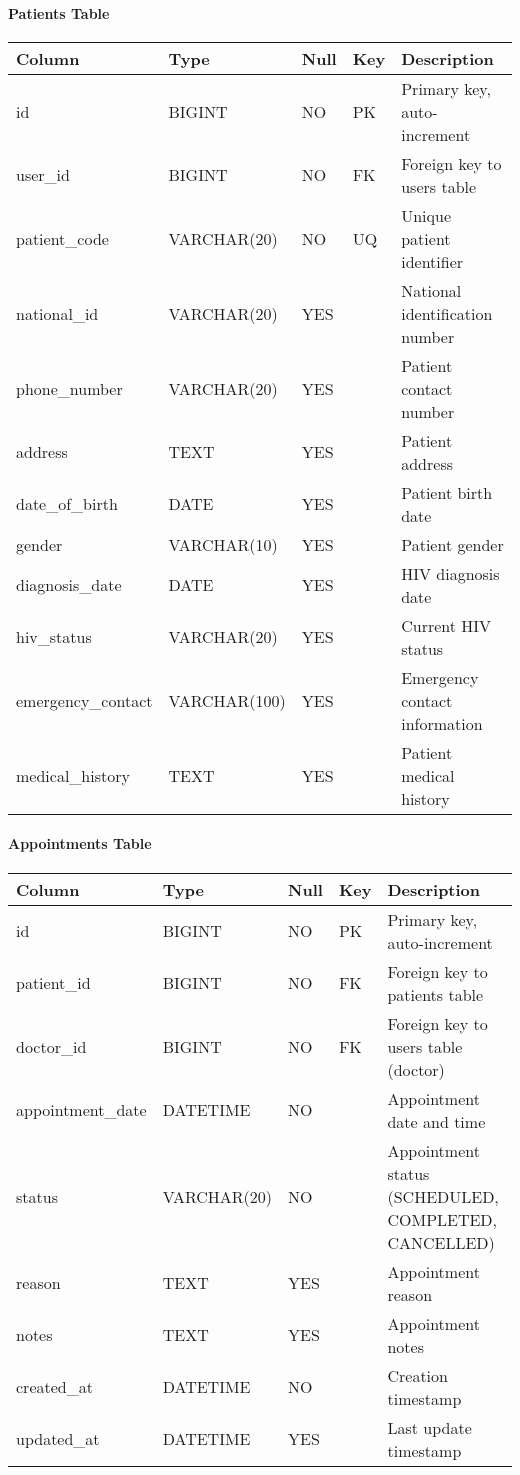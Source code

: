 \documentclass[12pt,a4paper]{article}
\begin{document}
\paragraph{Patients Table}
\begin{longtable}{|p{3cm}|p{2cm}|p{2cm}|p{2cm}|p{5cm}|}
\hline
\textbf{Column} & \textbf{Type} & \textbf{Null} & \textbf{Key} & \textbf{Description} \\
\hline
id & BIGINT & NO & PK & Primary key, auto-increment \\
\hline
user\_id & BIGINT & NO & FK & Foreign key to users table \\
\hline
patient\_code & VARCHAR(20) & NO & UQ & Unique patient identifier \\
\hline
national\_id & VARCHAR(20) & YES & & National identification number \\
\hline
phone\_number & VARCHAR(20) & YES & & Patient contact number \\
\hline
address & TEXT & YES & & Patient address \\
\hline
date\_of\_birth & DATE & YES & & Patient birth date \\
\hline
gender & VARCHAR(10) & YES & & Patient gender \\
\hline
diagnosis\_date & DATE & YES & & HIV diagnosis date \\
\hline
hiv\_status & VARCHAR(20) & YES & & Current HIV status \\
\hline
emergency\_contact & VARCHAR(100) & YES & & Emergency contact information \\
\hline
medical\_history & TEXT & YES & & Patient medical history \\
\hline
\end{longtable}

\paragraph{Appointments Table}
\begin{longtable}{|p{3cm}|p{2cm}|p{2cm}|p{2cm}|p{5cm}|}
\hline
\textbf{Column} & \textbf{Type} & \textbf{Null} & \textbf{Key} & \textbf{Description} \\
\hline
id & BIGINT & NO & PK & Primary key, auto-increment \\
\hline
patient\_id & BIGINT & NO & FK & Foreign key to patients table \\
\hline
doctor\_id & BIGINT & NO & FK & Foreign key to users table (doctor) \\
\hline
appointment\_date & DATETIME & NO & & Appointment date and time \\
\hline
status & VARCHAR(20) & NO & & Appointment status (SCHEDULED, COMPLETED, CANCELLED) \\
\hline
reason & TEXT & YES & & Appointment reason \\
\hline
notes & TEXT & YES & & Appointment notes \\
\hline
created\_at & DATETIME & NO & & Creation timestamp \\
\hline
updated\_at & DATETIME & YES & & Last update timestamp \\
\hline
\end{longtable}
\end{document}
